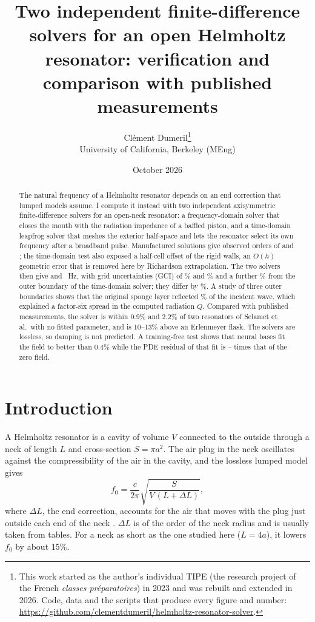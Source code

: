\documentclass[11pt,a4paper]{article}
\title{Two independent finite-difference solvers for an open Helmholtz resonator:
verification and comparison with published measurements}
\author{Cl\'ement Dumeril\thanks{This work started as the author's individual TIPE
(the research project of the French \emph{classes pr\'eparatoires}) in 2023 and was rebuilt
and extended in 2026. Code, data and the scripts that produce every figure and number:
\url{https://github.com/clementdumeril/helmholtz-resonator-solver}.}\\[2pt]
\small University of California, Berkeley (MEng)}
\date{October 2026}
\begin{document}
\maketitle

\begin{abstract}
\noindent
The natural frequency of a Helmholtz resonator depends on an end correction that lumped
models assume. I compute it instead with two independent axisymmetric finite-difference
solvers for an open-neck resonator: a frequency-domain solver that closes the mouth with
the radiation impedance of a baffled piston, and a time-domain leapfrog solver that meshes
the exterior half-space and lets the resonator select its own frequency after a broadband
pulse. Manufactured solutions give observed orders of \mmsHarmonicOrder{} and
\mmsTransientOrder{}; the time-domain test also exposed a half-cell offset of the rigid
walls, an $O(h)$ geometric error that is removed here by Richardson extrapolation. The two
solvers then give \fExt{} and \tExt{}~Hz, with grid uncertainties (GCI) of \fGCI\% and
\tGCI\% and a further \fZeroSpread\% from the outer boundary of the time-domain solver; they
differ by \solverGap\%. A study of three outer boundaries shows that the original sponge
layer reflected \% of the incident wave, which explained a factor-six spread in
the computed radiation $Q$. Compared with published measurements, the solver is within
0.9\% and 2.2\% of two resonators of Selamet et al.\ with no fitted parameter, and is
10--13\% above an Erlenmeyer flask. The solvers are lossless, so damping is not predicted.
A training-free test shows that neural bases fit the field to better than 0.4\% while the
PDE residual of that fit is \basesResMin--\basesResMax{} times that of the zero field.
\end{abstract}

\section{Introduction}

A Helmholtz resonator is a cavity of volume $V$ connected to the outside through a neck of
length $L$ and cross-section $S=\pi a^2$. The air plug in the neck oscillates against the
compressibility of the air in the cavity, and the lossless lumped model gives
\begin{equation}
  f_0 = \frac{c}{2\pi}\sqrt{\frac{S}{V\,(L+\Delta L)}} ,
  \label{eq:lumped}
\end{equation}
where $\Delta L$, the end correction, accounts for the air that moves with the plug just
outside each end of the neck \citep{helmholtz1860,rayleigh1896,ingard1953}. $\Delta L$ is of
the order of the neck radius and is usually taken from tables. For a neck as short as the
one studied here ($L=4a$), it lowers $f_0$ by about 15\%.
\end{document}
